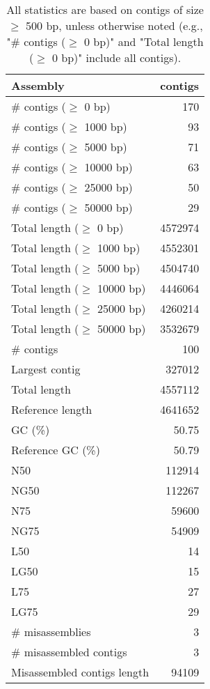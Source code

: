 \documentclass[12pt,a4paper]{article}
\begin{document}
\begin{table}[ht]
\begin{center}
\caption{All statistics are based on contigs of size $\geq$ 500 bp, unless otherwise noted (e.g., "\# contigs ($\geq$ 0 bp)" and "Total length ($\geq$ 0 bp)" include all contigs).}
\begin{tabular}{|l*{1}{|r}|}
\hline
Assembly & contigs \\ \hline
\# contigs ($\geq$ 0 bp) & 170 \\ \hline
\# contigs ($\geq$ 1000 bp) & 93 \\ \hline
\# contigs ($\geq$ 5000 bp) & 71 \\ \hline
\# contigs ($\geq$ 10000 bp) & 63 \\ \hline
\# contigs ($\geq$ 25000 bp) & 50 \\ \hline
\# contigs ($\geq$ 50000 bp) & 29 \\ \hline
Total length ($\geq$ 0 bp) & 4572974 \\ \hline
Total length ($\geq$ 1000 bp) & 4552301 \\ \hline
Total length ($\geq$ 5000 bp) & 4504740 \\ \hline
Total length ($\geq$ 10000 bp) & 4446064 \\ \hline
Total length ($\geq$ 25000 bp) & 4260214 \\ \hline
Total length ($\geq$ 50000 bp) & 3532679 \\ \hline
\# contigs & 100 \\ \hline
Largest contig & 327012 \\ \hline
Total length & 4557112 \\ \hline
Reference length & 4641652 \\ \hline
GC (\%) & 50.75 \\ \hline
Reference GC (\%) & 50.79 \\ \hline
N50 & 112914 \\ \hline
NG50 & 112267 \\ \hline
N75 & 59600 \\ \hline
NG75 & 54909 \\ \hline
L50 & 14 \\ \hline
LG50 & 15 \\ \hline
L75 & 27 \\ \hline
LG75 & 29 \\ \hline
\# misassemblies & 3 \\ \hline
\# misassembled contigs & 3 \\ \hline
Misassembled contigs length & 94109 \\ \hline

\end{tabular}
\end{center}
\end{table}
\end{document}
